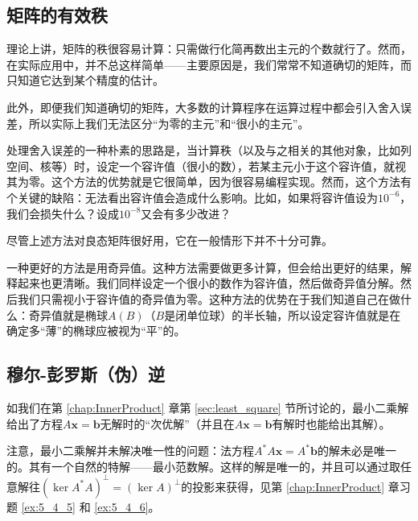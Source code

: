 \subsection{矩阵的有效秩}

理论上讲，矩阵的秩很容易计算：只需做行化简再数出主元的个数就行了。然而，在实际应用中，并不总这样简单——主要原因是，我们常常不知道确切的矩阵，而只知道它达到某个精度的估计。

此外，即便我们知道确切的矩阵，大多数的计算程序在运算过程中都会引入舍入误差，所以实际上我们无法区分“为零的主元”和“很小的主元”。

处理舍入误差的一种朴素的思路是，当计算秩（以及与之相关的其他对象，比如列空间、核等）时，设定一个容许值（很小的数），若某主元小于这个容许值，就视其为零。这个方法的优势就是它很简单，因为很容易编程实现。然而，这个方法有个关键的缺陷：无法看出容许值会造成什么影响。比如，如果将容许值设为$10^{-6}$，我们会损失什么？设成$10^{-8}$又会有多少改进？

尽管上述方法对良态矩阵很好用，它在一般情形下并不十分可靠。

一种更好的方法是用奇异值。这种方法需要做更多计算，但会给出更好的结果，解释起来也更清晰。我们同样设定一个很小的数作为容许值，然后做奇异值分解。然后我们只需视小于容许值的奇异值为零。这种方法的优势在于我们知道自己在做什么：奇异值就是椭球$A(B)$（$B$是闭单位球）的半长轴，所以设定容许值就是在确定多“薄”的椭球应被视为“平”的。

\subsection{穆尔-彭罗斯（伪）逆}

如我们在第 \ref{chap:InnerProduct} 章第 \ref{sec:least_square} 节所讨论的，最小二乘解给出了方程$A\mathbf{x}=\mathbf{b}$无解时的“次优解”（并且在$A\mathbf{x}=\mathbf{b}$有解时也能给出其解）。

注意，最小二乘解并未解决唯一性的问题：法方程$A^*A\mathbf{x}=A^*\mathbf{b}$的解未必是唯一的。其有一个自然的特解——最小范数解。这样的解是唯一的，并且可以通过取任意解往$(\ker A^*A)^\perp=(\ker A)^\perp$的投影来获得，见第 \ref{chap:InnerProduct} 章习题 \ref{ex:5_4_5} 和 \ref{ex:5_4_6}。

